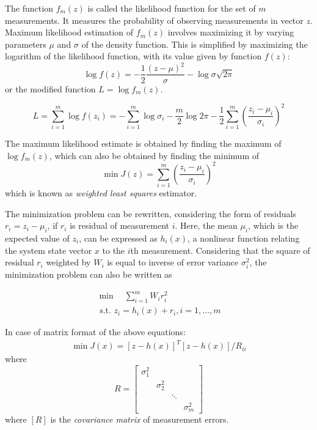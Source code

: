 The function $f_m(z)$ is called the likelihood function for the set of $m$ measurements. It measures the probability of observing measurements in vector $z$. Maximum likelihood estimation of $f_m(z)$ involves maximizing it by varying parameters $\mu$ and $\sigma$ of the density function. This is simplified by maximizing the logarithm of the likelihood function, with its value given by function $f(z)$:
\begin{equation}
    \log f(z)=-\frac{1}{2} \frac{(z-\mu)^{2}}{\sigma}-\log \sigma \sqrt{2 \pi}
\end{equation}
or the modified function \(L=\log f_{m}(z)\).

\begin{equation}
    L=\sum_{i=1}^{m} \log f\left(z_{i}\right)=-\sum_{i=1}^{m} \log \sigma_{i}-\frac{m}{2} \log 2 \pi-\frac{1}{2} \sum_{i=1}^{m}\left(\frac{z_{i}-\mu_{i}}{\sigma_{i}}\right)^{2}
\end{equation}

The maximum likelihood estimate is obtained by finding the maximum of \(\log f_{m}(z)\), which can also be obtained by finding the minimum of 
\begin{equation}
    \min J(z)=\sum_{i=1}^{m}\left(\frac{z_{i}-\mu_{i}}{\sigma_{i}}\right)^{2}
\label{eq:wls_estimator}    
\end{equation}
which is known as \textit{weighted least squares} estimator.

The minimization problem can be rewritten, considering the form of residuals \(r_{i}=z_{i}-\mu_{i}\), if $r_i$ is residual of measurement $i$. Here, the mean $\mu_{i}$, which is the expected value of $z_{i}$, can be expressed as $h_i(x)$, a nonlinear function relating the system state vector $x$ to the $i$th measurement. Considering that the square of residual $r_i$ weighted by $W_i$ is equal to inverse of error variance $\sigma_{i}^2$, the minimization problem can also be written as

\begin{equation}
    \begin{array}{c}
    \operatorname{min} \quad \sum_{i=1}^{m} W_{i} r_{i}^{2} \\
    \text { s.t. } z_{i}=h_{i}(x)+r_{i}, i=1, \ldots, m
\end{array}
\label{eq:min_rsd}
\end{equation}

In case of matrix format of the above equations:
\begin{equation}
    \begin{array}{l}
\min J(x)=[z-h(x)]^{T} [z-h(x)] / R_{ii}
\end{array}
\end{equation}
where
\begin{equation}
    R=\left[\begin{array}{llll}
\sigma_{1}^{2} & & & \\
& \sigma_{2}^{2} & & \\
& & \ddots & \\
& & & \sigma_{m}^{2}
\end{array}\right]
\label{eq:mlm_r}
\end{equation}
where $[R]$ is the \textit{covariance matrix} of measurement errors.

